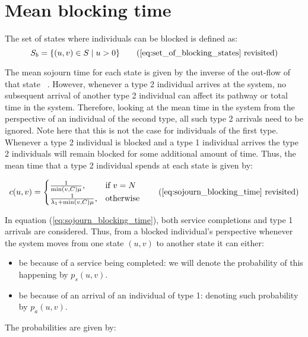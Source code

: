 \section{Mean blocking time} \label{sec:appendix_mean_blocking}

The set of states where individuals can be blocked is defined as:
\begin{equation*}
    S_b = \{(u,v) \in S \; | \; u > 0\} 
    \tag{\ref{eq:set_of_blocking_states} revisited}
\end{equation*}

The mean sojourn time for each state is given by the inverse of the out-flow of
that state ~\cite{Stewart2019}.
However, whenever a type 2 individual arrives at the system, no subsequent 
arrival of another type 2 individual can affect its pathway or total time in 
the system.
Therefore, looking at the mean time in the system from the perspective of an 
individual of the second type, all such type 2 arrivals need to be ignored.
Note here that this is not the case for individuals of the first type.
Whenever a type 2 individual is blocked and a type 1 individual arrives the type
2 individuals will remain blocked for some additional amount of time.
Thus, the mean time that a type 2 individual spends at each state is given by:

\begin{equation*}
    c(u,v) = 
    \begin{cases}
        \frac{1}{\min(v,C) \mu}, & \text{if } v = N\\
        \frac{1}{\lambda_1 + \min(v,C) \mu}, & \text{otherwise}
    \end{cases} 
    \tag{\ref{eq:sojourn_blocking_time} revisited}
\end{equation*}

In equation (\ref{eq:sojourn_blocking_time}), both service completions and 
type 1 arrivals are considered. 
Thus, from a blocked individual's perspective whenever the system moves from one 
state \((u,v)\)
to another state it can either:

\begin{itemize}
    \item be because of a service being completed: we will denote the probability 
    of this happening by \(p_s(u,v)\). 
    \item be because of an arrival of an individual of type 1: denoting such 
    probability by \(p_a(u,v)\).
\end{itemize}
The probabilities are given by:

